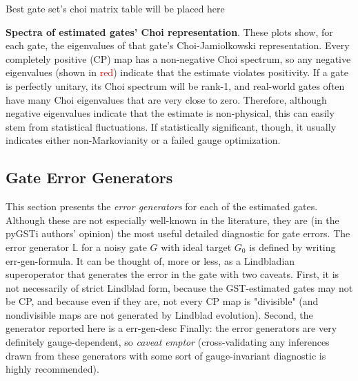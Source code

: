 \documentclass{article}[11pt]
\newcommand{\putfield}[2]{#2}
\begin{document}
{\begin{table}[h]
  \begin{center}
    \begin{adjustbox}{max width=\textwidth}
      \putfield{bestGatesetChoiEvalTable}{Best gate set's choi matrix table will be placed here}
    \end{adjustbox}
    \caption{\textbf{Spectra of estimated gates' Choi representation}.  These plots show, for each gate, the eigenvalues of that gate's Choi-Jamiolkowski representation.  Every completely positive (CP) map has a non-negative Choi spectrum, so any negative eigenvalues (shown in \textcolor{red}{red}) indicate that the estimate violates positivity.  If a gate is perfectly unitary, its Choi spectrum will be rank-1, and real-world gates often have many Choi eigenvalues that are very close to zero.  Therefore, although negative eigenvalues indicate that the estimate is non-physical, this can easily stem from statistical fluctuations.  If statistically significant, though, it usually indicates either non-Markovianity or a failed gauge optimization.\label{bestGatesetChoiTable}}
  \end{center}
\end{table}


\subsection{Gate Error Generators}
This section presents the \emph{error generators} for each of the estimated gates.  Although these are not especially well-known in the literature, they are (in the pyGSTi authors' opinion) the most useful detailed diagnostic for gate errors.  The error generator $\mathbb{L}$ for a noisy gate $G$ with ideal target $G_0$ is defined by writing \putfield{errorgenformula}{err-gen-formula}.  It can be thought of, more or less, as a Lindbladian superoperator that generates the error in the gate \textendash with two caveats.  First, it is not necessarily of strict Lindblad form, because the GST-estimated gates may not be CP, and because even if they are, not every CP map is "divisible" (and nondivisible maps are not generated by Lindblad evolution).  Second, the generator reported here is a \putfield{errorgendescription}{err-gen-desc}  Finally:  the error generators are very definitely gauge-dependent, so \emph{caveat emptor} (cross-validating any inferences drawn from these generators with some sort of gauge-invariant diagnostic is highly recommended).


}
\end{document}

